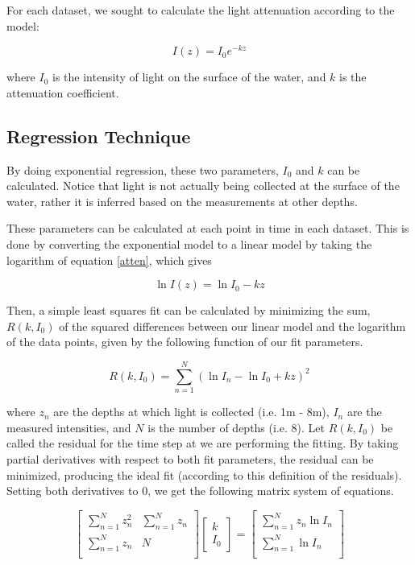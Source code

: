 For each dataset, we sought to calculate the light attenuation according to the model:

\begin{equation}
	I(z) = I_0e^{-kz}
	\label{atten}
\end{equation}

where $I_0$ is the intensity of light on the surface of the water, and $k$ is the attenuation coefficient.

\pagebreak
\subsection{Regression Technique}
By doing exponential regression, these two parameters, $I_0$ and $k$ can be calculated. Notice that light is not actually being collected at the surface of the water, rather it is inferred based on the measurements at other depths.

These parameters can be calculated at each point in time in each dataset. This is done by converting the exponential model to a linear model by taking the logarithm of equation \ref{atten}, which gives

\begin{equation}
	\ln I(z) = \ln I_0 - kz
	\label{log_atten}
\end{equation}

Then, a simple least squares fit can be calculated by minimizing the sum, $R(k,I_0)$ of the squared differences between our linear model and the logarithm of the data points, given by the following function of our fit parameters.

\begin{equation}
	R(k,I_0) = \sum_{n=1}^N (\ln I_n - \ln I_0 + kz)^2
	\label{resid}
\end{equation}

where $z_n$ are the depths at which light is collected (i.e. 1m - 8m), $I_n$ are the measured intensities, and $N$ is the number of depths (i.e. 8). Let $R(k,I_0)$ be called the residual for the time step at we are performing the fitting. By taking partial derivatives with respect to both fit parameters, the residual can be minimized, producing the ideal fit (according to this definition of the residuals). Setting both derivatives to 0, we get the following matrix system of equations.

\newcommand\xls{z_n}
\newcommand\yls{\ln I_n}
\begin{equation}
	\begin{bmatrix}
		\sum_{n=1}^N \xls^2 & \sum_{n=1}^N \xls \\
		\sum_{n=1}^N \xls   & N \\
	\end{bmatrix}
%
	\begin{bmatrix}
		k \\
		I_0
	\end{bmatrix}
%
	=
%
	\begin{bmatrix}
		\sum_{n=1}^N \xls\yls \\
		\sum_{n=1}^N \yls \\
	\end{bmatrix}
	\label{lstsq}
\end{equation}

